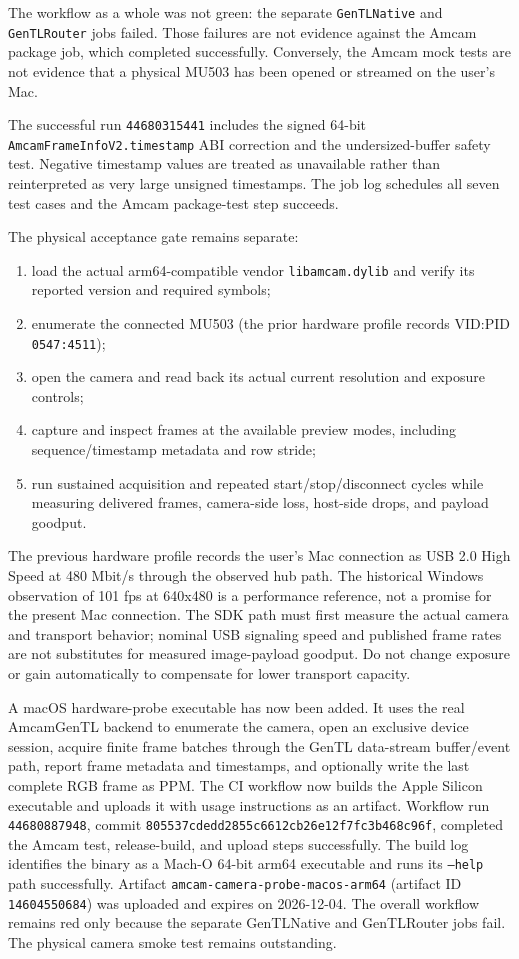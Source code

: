 \documentclass[11pt,a4paper]{report}
\begin{document}
The workflow as a whole was not green: the separate \texttt{GenTLNative} and \texttt{GenTLRouter} jobs failed. Those failures are not evidence against the Amcam package job, which completed successfully. Conversely, the Amcam mock tests are not evidence that a physical MU503 has been opened or streamed on the user's Mac.

The successful run \texttt{44680315441} includes the signed 64-bit \texttt{AmcamFrameInfoV2.timestamp} ABI correction and the undersized-buffer safety test. Negative timestamp values are treated as unavailable rather than reinterpreted as very large unsigned timestamps. The job log schedules all seven test cases and the Amcam package-test step succeeds.

The physical acceptance gate remains separate:
\begin{enumerate}
\item load the actual arm64-compatible vendor \texttt{libamcam.dylib} and verify its reported version and required symbols;
\item enumerate the connected MU503 (the prior hardware profile records VID:PID \texttt{0547:4511});
\item open the camera and read back its actual current resolution and exposure controls;
\item capture and inspect frames at the available preview modes, including sequence/timestamp metadata and row stride;
\item run sustained acquisition and repeated start/stop/disconnect cycles while measuring delivered frames, camera-side loss, host-side drops, and payload goodput.
\end{enumerate}

The previous hardware profile records the user's Mac connection as USB 2.0 High Speed at 480 Mbit/s through the observed hub path. The historical Windows observation of 101 fps at 640x480 is a performance reference, not a promise for the present Mac connection. The SDK path must first measure the actual camera and transport behavior; nominal USB signaling speed and published frame rates are not substitutes for measured image-payload goodput. Do not change exposure or gain automatically to compensate for lower transport capacity.

A macOS hardware-probe executable has now been added. It uses the real AmcamGenTL backend to enumerate the camera, open an exclusive device session, acquire finite frame batches through the GenTL data-stream buffer/event path, report frame metadata and timestamps, and optionally write the last complete RGB frame as PPM. The CI workflow now builds the Apple Silicon executable and uploads it with usage instructions as an artifact. Workflow run \texttt{44680887948}, commit \texttt{805537cdedd2855c6612cb26e12f7fc3b468c96f}, completed the Amcam test, release-build, and upload steps successfully. The build log identifies the binary as a Mach-O 64-bit arm64 executable and runs its \texttt{--help} path successfully. Artifact \texttt{amcam-camera-probe-macos-arm64} (artifact ID \texttt{14604550684}) was uploaded and expires on 2026-12-04. The overall workflow remains red only because the separate GenTLNative and GenTLRouter jobs fail. The physical camera smoke test remains outstanding.
\end{document}
